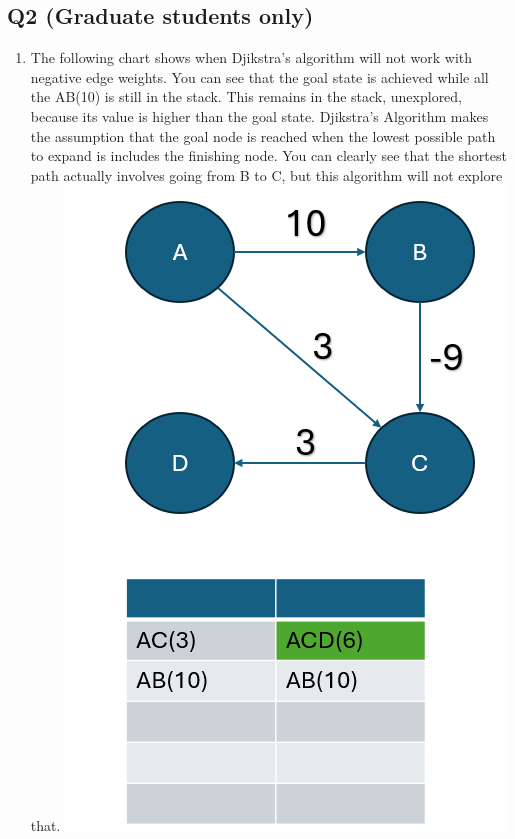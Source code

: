 \documentclass{article}
\begin{document}
\subsection*{Q2 (Graduate students only)}
\begin{enumerate}[label=(\alph*)]
    \item The following chart shows when Djikstra's algorithm will not work with negative edge weights. You can see that the goal state is achieved while all the AB(10) is still in the stack. This remains in the stack, unexplored, because its value is higher than the goal state. Djikstra's Algorithm makes the assumption that the goal node is reached when the lowest possible path to expand is includes the finishing node. You can clearly see that the shortest path actually involves going from B to C, but this algorithm will not explore that.
    \subitem \includegraphics[width=.75\textwidth]{problemg2.png}
\end{enumerate}
\end{document}
